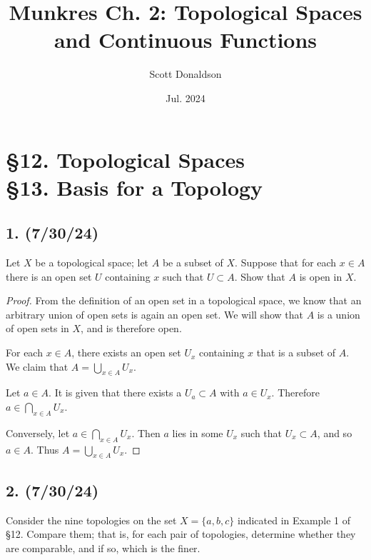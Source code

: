 \documentclass{article}
\title{Munkres Ch. 2: Topological Spaces and Continuous Functions}
\author{Scott Donaldson}
\date{Jul. 2024}
\begin{document}
\maketitle

\section*{§12. Topological Spaces\\§13. Basis for a Topology}

\subsection*{1. (7/30/24)}

Let $X$ be a topological space; let $A$ be a subset of $X$. Suppose that for each $x \in A$ there is an open set $U$ containing $x$ such that $U \subset A$. Show that $A$ is open in $X$.

\begin{proof}
    From the definition of an open set in a topological space, we know that an arbitrary union of open sets is again an open set. We will show that $A$ is a union of open sets in $X$, and is therefore open.

    For each $x \in A$, there exists an open set $U_x$ containing $x$ that is a subset of $A$. We claim that $A = \bigcup_{x \in A} U_x$.

    Let $a \in A$. It is given that there exists a $U_a \subset A$ with $a \in U_x$. Therefore $a \in \bigcap_{x \in A} U_x$.

    Conversely, let $a \in \bigcap_{x \in A} U_x$. Then $a$ lies in some $U_x$ such that $U_x \subset A$, and so $a \in A$. Thus $A = \bigcup_{x \in A} U_x$.
\end{proof}

\subsection*{2. (7/30/24)}

Consider the nine topologies on the set $X = \{ a, b, c \}$ indicated in Example 1 of §12. Compare them; that is, for each pair of topologies, determine whether they are comparable, and if so, which is the finer.
\end{document}
